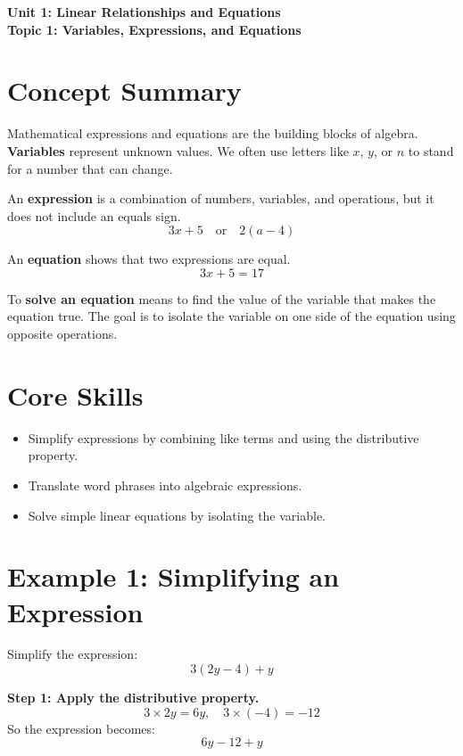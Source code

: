 \documentclass[14pt]{extarticle}
\begin{document}
\raggedright
{}

\begin{center}
    \LARGE \textbf{Unit 1: Linear Relationships and Equations} \\[6pt]
    \Large \textbf{Topic 1: Variables, Expressions, and Equations}
\end{center}

\vspace{1em}

\section*{Concept Summary}

Mathematical expressions and equations are the building blocks of algebra.  
\textbf{Variables} represent unknown values. We often use letters like \(x\), \(y\), or \(n\) to stand for a number that can change.  

An \textbf{expression} is a combination of numbers, variables, and operations, but it does not include an equals sign.  
\[
3x + 5 \quad \text{or} \quad 2(a - 4)
\]

An \textbf{equation} shows that two expressions are equal.  
\[
3x + 5 = 17
\]

To \textbf{solve an equation} means to find the value of the variable that makes the equation true.  
The goal is to isolate the variable on one side of the equation using opposite operations.

\section*{Core Skills}
\begin{itemize}
    \item Simplify expressions by combining like terms and using the distributive property.
    \item Translate word phrases into algebraic expressions.
    \item Solve simple linear equations by isolating the variable.
\end{itemize}

\section*{Example 1: Simplifying an Expression}

Simplify the expression:
\[
3(2y - 4) + y
\]

\textbf{Step 1: Apply the distributive property.}
\[
3 \times 2y = 6y, \quad 3 \times (-4) = -12
\]
So the expression becomes:
\[
6y - 12 + y
\]
\end{document}
